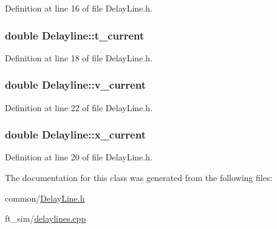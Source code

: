 Definition at line 16 of file DelayLine.h.

\hypertarget{classDelayline_accecb3d6c35e2849d52531b0cb84b84d}{
\subsubsection[{t\_\-current}]{\setlength{\rightskip}{0pt plus 5cm}double {\bf Delayline::t\_\-current}}}
\label{classDelayline_accecb3d6c35e2849d52531b0cb84b84d}


Definition at line 18 of file DelayLine.h.

\hypertarget{classDelayline_a3f63bda7a455b53ab1be0e98bea2e1ae}{
\subsubsection[{v\_\-current}]{\setlength{\rightskip}{0pt plus 5cm}double {\bf Delayline::v\_\-current}}}
\label{classDelayline_a3f63bda7a455b53ab1be0e98bea2e1ae}


Definition at line 22 of file DelayLine.h.

\hypertarget{classDelayline_a4ea0c2cd99e17d74551bf76056095925}{
\subsubsection[{x\_\-current}]{\setlength{\rightskip}{0pt plus 5cm}double {\bf Delayline::x\_\-current}}}
\label{classDelayline_a4ea0c2cd99e17d74551bf76056095925}


Definition at line 20 of file DelayLine.h.



The documentation for this class was generated from the following files:\begin{DoxyCompactItemize}
\item 
common/\hyperlink{DelayLine_8h}{DelayLine.h}\item 
ft\_\-sim/\hyperlink{delaylines_8cpp}{delaylines.cpp}\end{DoxyCompactItemize}
